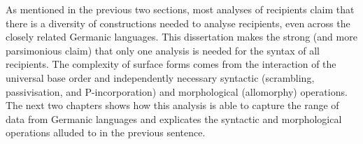 As mentioned in the previous two sections, most analyses of recipients claim that there is a diversity of constructions needed to analyse recipients, even across the closely related Germanic languages. This dissertation makes the strong (and more parsimonious claim) that only one analysis is needed for the syntax of all recipients. The complexity of surface forms comes from the interaction of the universal base order and independently necessary syntactic (scrambling, passivisation, and P-incorporation) and morphological (allomorphy) operations. The next two chapters shows how this analysis is able to capture the range of data from Germanic languages and explicates the syntactic and morphological operations alluded to in the previous sentence.

%
